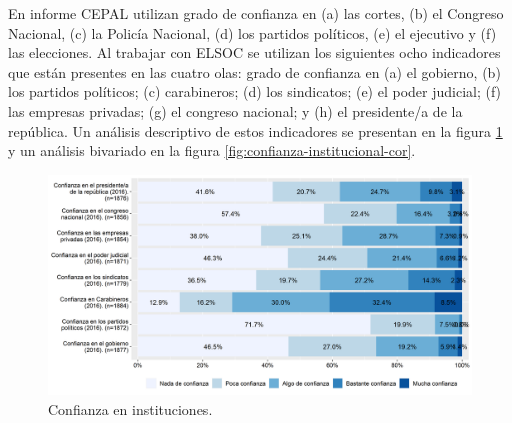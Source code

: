 \documentclass[
  12pt,
]{book}
\begin{document}
En informe CEPAL utilizan grado de confianza en (a) las cortes, (b) el Congreso Nacional, (c) la Policía Nacional, (d) los partidos políticos, (e) el ejecutivo y (f) las elecciones. Al trabajar con ELSOC se utilizan los siguientes ocho indicadores que están presentes en las cuatro olas: grado de confianza en (a) el gobierno, (b) los partidos políticos; (c) carabineros; (d) los sindicatos; (e) el poder judicial; (f) las empresas privadas; (g) el congreso nacional; y (h) el presidente/a de la república. Un análisis descriptivo de estos indicadores se presentan en la figura \ref{fig:confianza-institucional} y un análisis bivariado en la figura \ref{fig:confianza-institucional-cor}.

\begin{figure}[H]

{\centering \includegraphics[width=1\linewidth,height=1\textheight]{output/graphs/confianza-institucional} 

}

\caption{Confianza en instituciones.}\label{fig:confianza-institucional}
\end{figure}
\end{document}
